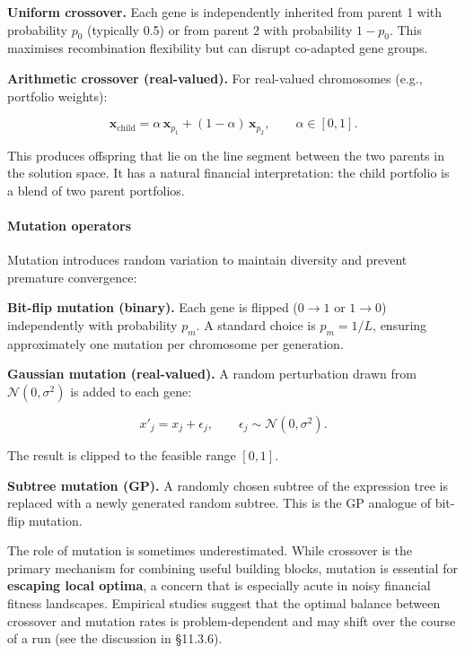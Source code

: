 \textbf{Uniform crossover.} Each gene is independently inherited from parent 1 with probability $p_0$ (typically 0.5) or from parent 2 with probability $1 - p_0$. This maximises recombination flexibility but can disrupt co-adapted gene groups.

\textbf{Arithmetic crossover (real-valued).} For real-valued chromosomes (e.g., portfolio weights):

\begin{equation}
\mathbf{x}_{\text{child}} = \alpha \, \mathbf{x}_{p_1} + (1 - \alpha) \, \mathbf{x}_{p_2}, \qquad \alpha \in [0, 1]. \tag{11.4}
\end{equation}

This produces offspring that lie on the line segment between the two parents in the solution space. It has a natural financial interpretation: the child portfolio is a blend of two parent portfolios.

\paragraph{Mutation operators}

Mutation introduces random variation to maintain diversity and prevent premature convergence:

\textbf{Bit-flip mutation (binary).} Each gene is flipped ($0 \to 1$ or $1 \to 0$) independently with probability $p_m$. A standard choice is $p_m = 1/L$, ensuring approximately one mutation per chromosome per generation.

\textbf{Gaussian mutation (real-valued).} A random perturbation drawn from $\mathcal{N}(0, \sigma^2)$ is added to each gene:

\begin{equation}
x'_j = x_j + \epsilon_j, \qquad \epsilon_j \sim \mathcal{N}(0, \sigma^2).
\end{equation}

The result is clipped to the feasible range $[0, 1]$.

\textbf{Subtree mutation (GP).} A randomly chosen subtree of the expression tree is replaced with a newly generated random subtree. This is the GP analogue of bit-flip mutation.

The role of mutation is sometimes underestimated. While crossover is the primary mechanism for combining useful building blocks, mutation is essential for \textbf{escaping local optima}, a concern that is especially acute in noisy financial fitness landscapes. Empirical studies suggest that the optimal balance between crossover and mutation rates is problem-dependent and may shift over the course of a run (see the discussion in §11.3.6).


